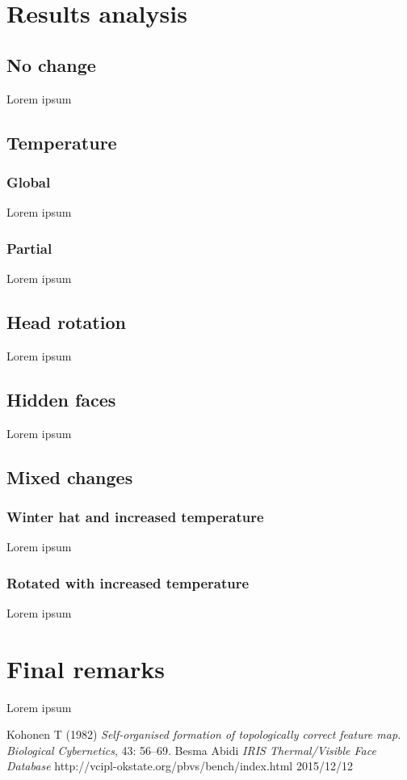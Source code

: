 \documentclass[pdftex]{article}
\begin{document}
\section{Results analysis}
\subsection{No change}
Lorem ipsum
\subsection{Temperature}
\subsubsection{Global}
Lorem ipsum
\subsubsection{Partial}
Lorem ipsum
\subsection{Head rotation}
Lorem ipsum
\subsection{Hidden faces}
Lorem ipsum
\subsection{Mixed changes}
\subsubsection{Winter hat and increased temperature}
Lorem ipsum
\subsubsection{Rotated with increased temperature}
Lorem ipsum

\section{Final remarks}
Lorem ipsum

 \begin{thebibliography}{1}
 Kohonen T (1982) {\em Self-organised formation of topologically correct feature
map. Biological Cybernetics}, 43: 56–69.
 Besma Abidi {\em IRIS Thermal/Visible Face Database} http://vcipl-okstate.org/pbvs/bench/index.html 2015/12/12
\end{thebibliography}
\end{document}
